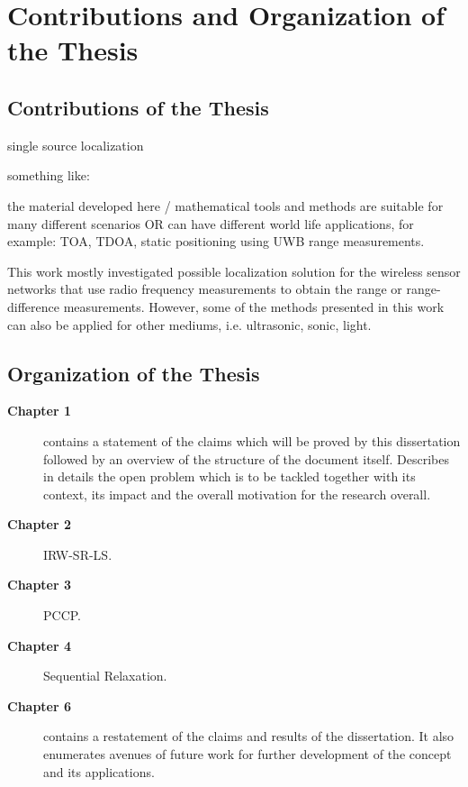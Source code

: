 \section{Contributions and Organization of the Thesis}

\subsection{Contributions  of the Thesis} \label{contributions}
single source localization

something like:

the material developed here / mathematical tools and methods are suitable for many different scenarios 
OR
can have different world life applications, for example: TOA, TDOA, static positioning using UWB range measurements. 

This work mostly investigated possible localization solution for the wireless sensor networks that use radio frequency measurements to obtain the range or range-difference measurements. However, some of the methods presented in this work can also be applied for other mediums, i.e. ultrasonic, sonic, light. 

\subsection{Organization of the Thesis} \label{organization}

\begin{description}
\item[\textbf{Chapter 1}] contains a statement of
the claims which will be proved by this dissertation followed by an overview of the structure of the document itself. Describes in details the open problem which is to be tackled together with its context, its impact and the overall motivation for the research overall.
\item[\textbf{Chapter 2}] IRW-SR-LS.
\item[\textbf{Chapter 3}] PCCP.
\item[\textbf{Chapter 4}] Sequential Relaxation.
\item[\textbf{Chapter 6}] contains a restatement of the claims and results of the dissertation. It also enumerates avenues of future work for further development of the concept and its applications.
\end{description}